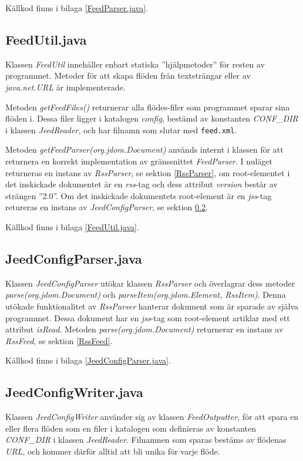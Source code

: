 \documentclass[a4paper, 12pt]{article}
\begin{document}
Källkod finns i bilaga \ref{FeedParser.java}.

\subsection{FeedUtil.java}\label{FeedUtil}
Klassen \textit{FeedUtil} innehåller enbart statiska
''hjälp\-metoder'' för resten av programmet. Metoder för att skapa
flöden från textsträngar eller av \textit{java.net.URL} är
implementerade.

Metoden \textit{getFeedFiles()}\label{getFeedFiles()} returnerar alla
flödes-filer som programmet sparar sina flöden i. Dessa filer ligger i
katalogen \textit{config}, bestämd av konstanten \textit{CONF\_DIR} i
klassen \textit{JeedReader}, och har filnamn som slutar med
\verb!feed.xml!.

Metoden \textit{getFeedParser(org.jdom.Document)} används internt i
klassen för att returnera en korrekt implementation av gränssnittet
\textit{FeedParser}. I nuläget returneras en instans av
\textit{RssParser}, se sektion \ref{RssParser}, om root-elementet i
det inskickade dokumentet är en \textit{rss}-tag och dess attribut
\textit{version} består av strängen ''2.0''. Om det inskickade
dokumentets root-element är en \textit{jss}-tag retureras en instans
av \textit{JeedConfigParser}, se sektion \ref{JeedConfigParser}.

Källkod finns i bilaga \ref{FeedUtil.java}.

\subsection{JeedConfigParser.java}\label{JeedConfigParser}
Klassen \textit{JeedConfigParser} utökar klassen \textit{RssParser}
och överlagrar dess metoder \textit{parse(org.jdom.Document)} och
\textit{parseItem(org.jdom.Element, RssItem)}. Denna utökade
funktionalitet av \textit{RssParser} hanterar dokument som är sparade
av själva programmet. Dessa dokument har en \textit{jss}-tag som root-element
artiklar med ett attribut \textit{isRead}. Metoden
\textit{parse(org.jdom.Document)} returnerar en instans av
\textit{RssFeed}, se sektion \ref{RssFeed}.

Källkod finns i bilaga \ref{JeedConfigParser.java}.

\subsection{JeedConfigWriter.java}\label{JeedConfigWriter}
Klassen \textit{JeedConfigWriter} använder sig av klassen
\textit{FeedOutputter}, för att spara en eller flera flöden som en
filer i katalogen som definieras av konstanten \textit{CONF\_DIR} i
klassen \textit{JeedReader}. Filnamnen som sparas bestäms av flödenas
\textit{URL}, och kommer därför alltid att bli unika för varje flöde.
\end{document}
